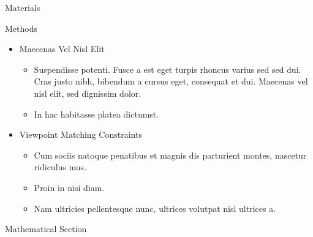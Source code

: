 \documentclass[final,hyperref={pdfpagelabels=false}]{beamer}
\begin{document}
\begin{frame}[t]
\begin{columns}[t]
\begin{column}{.465\textwidth}
\begin{gtblock}{Materials}
\end{gtblock}


\begin{ctblock}{Methods}

\begin{itemize}
\item Maecenas Vel Nisl Elit
\begin{itemize}
\item Suspendisse potenti. Fusce a est eget turpis rhoncus varius sed sed dui. Cras justo nibh, bibendum a cursus eget, consequat et dui. Maecenas vel nisl elit, sed dignissim dolor.
\item In hac habitasse platea dictumst.
\end{itemize}

\item Viewpoint Matching Constraints
\begin{itemize}
\item Cum sociis natoque penatibus et magnis dis parturient montes, nascetur ridiculus mus.
\item Proin in nisi diam.
\item Nam ultricies pellentesque nunc, ultrices volutpat nisl ultrices a.
\end{itemize}
\end{itemize}

\end{ctblock}


\begin{otblock}{Mathematical Section}


\end{otblock}
\end{column}
\end{columns}
\end{frame}
\end{document}
